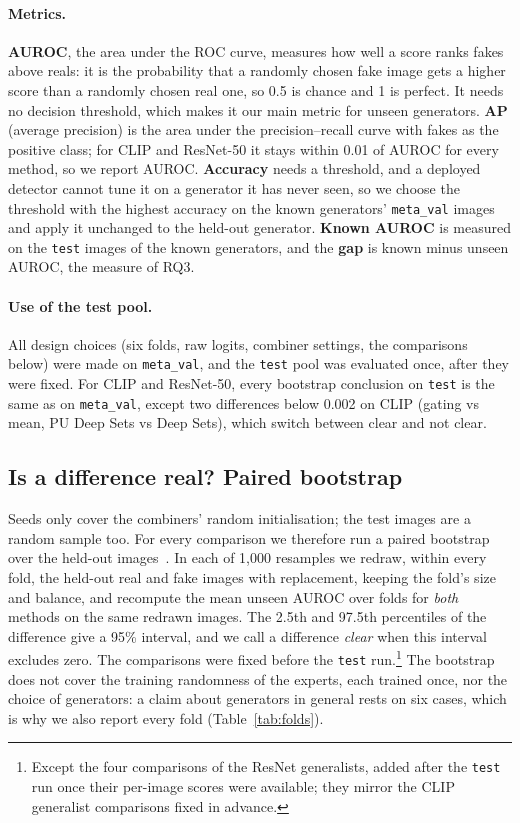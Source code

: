 \documentclass[10pt,a4paper]{article}
\begin{document}
\paragraph{Metrics.} \textbf{AUROC}, the area under the ROC curve, measures how well a score ranks fakes above reals: it is the probability that a randomly chosen fake image gets a higher score than a randomly chosen real one, so 0.5 is chance and 1 is perfect. It needs no decision threshold, which makes it our main metric for unseen generators. \textbf{AP} (average precision) is the area under the precision--recall curve with fakes as the positive class; for CLIP and ResNet-50 it stays within 0.01 of AUROC for every method, so we report AUROC. \textbf{Accuracy} needs a threshold, and a deployed detector cannot tune it on a generator it has never seen, so we choose the threshold with the highest accuracy on the known generators' \texttt{meta\_val} images and apply it unchanged to the held-out generator. \textbf{Known AUROC} is measured on the \texttt{test} images of the known generators, and the \textbf{gap} is known minus unseen AUROC, the measure of RQ3.

\paragraph{Use of the test pool.} All design choices (six folds, raw logits, combiner settings, the comparisons below) were made on \texttt{meta\_val}, and the \texttt{test} pool was evaluated once, after they were fixed. For CLIP and ResNet-50, every bootstrap conclusion on \texttt{test} is the same as on \texttt{meta\_val}, except two differences below 0.002 on CLIP (gating vs mean, PU Deep Sets vs Deep Sets), which switch between clear and not clear.

\subsection{Is a difference real? Paired bootstrap}\label{sec:bootstrap}

Seeds only cover the combiners' random initialisation; the test images are a random sample too. For every comparison we therefore run a paired bootstrap over the held-out images~\cite{efron1993bootstrap}. In each of 1,000 resamples we redraw, within every fold, the held-out real and fake images with replacement, keeping the fold's size and balance, and recompute the mean unseen AUROC over folds for \emph{both} methods on the same redrawn images. The 2.5th and 97.5th percentiles of the difference give a 95\% interval, and we call a difference \emph{clear} when this interval excludes zero. The comparisons were fixed before the \texttt{test} run.\footnote{Except the four comparisons of the ResNet generalists, added after the \texttt{test} run once their per-image scores were available; they mirror the CLIP generalist comparisons fixed in advance.} The bootstrap does not cover the training randomness of the experts, each trained once, nor the choice of generators: a claim about generators in general rests on six cases, which is why we also report every fold (Table~\ref{tab:folds}).
\end{document}
